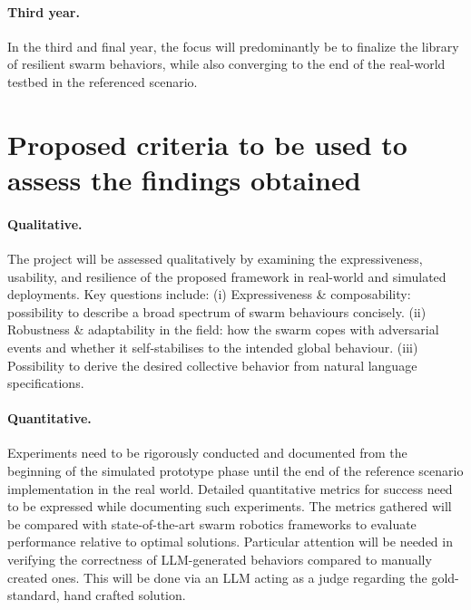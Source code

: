 \documentclass[12pt]{article}
\begin{document}
\paragraph{Third year.} In the third and final year, the focus will predominantly be to finalize the library of resilient swarm behaviors, while also converging to the end of the real-world testbed in the referenced scenario.

\section{Proposed criteria to be used to assess the findings obtained}

\paragraph{Qualitative.}
The project will be assessed qualitatively by examining the expressiveness, usability, and resilience of the proposed framework in real-world and simulated deployments.  
Key questions include:  
(i) Expressiveness \& composability: possibility to describe a broad spectrum of swarm behaviours concisely. 
(ii) Robustness \& adaptability in the field: how the swarm copes with adversarial events and whether it self‑stabilises to the intended global behaviour.  
(iii) Possibility to derive the desired collective behavior from natural language specifications.

\paragraph{Quantitative.}
Experiments need to be rigorously conducted and documented from the beginning of the simulated prototype phase until the end of the reference scenario implementation in the real world.
Detailed quantitative metrics for success need to be expressed while documenting such experiments. 
The metrics gathered will be compared with state-of-the-art swarm robotics frameworks to evaluate performance relative to optimal solutions.
Particular attention will be needed in verifying the correctness of LLM-generated behaviors compared to manually created ones.
This will be done via an LLM acting as a judge regarding the gold-standard, hand crafted solution.
\end{document}
